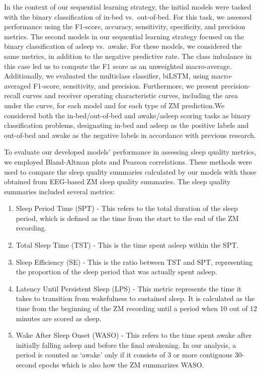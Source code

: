 \documentclass[
  super,
  preprint,
  3p]{elsarticle}
\begin{document}
In the context of our sequential learning strategy, the initial models
were tasked with the binary classification of in-bed vs.~out-of-bed. For
this task, we assessed performance using the F1-score, accuracy,
sensitivity, specificity, and precision metrics. The second models in
our sequential learning strategy focused on the binary classification of
asleep vs.~awake. For these models, we considered the same metrics, in
addition to the negative predictive rate. The class imbalance in this
case led us to compute the F1 score as an unweighted macro-average.
Additionally, we evaluated the multiclass classifier, biLSTM, using
macro-averaged F1-score, sensitivity, and precision. Furthermore, we
present precision-recall curves and receiver operating characteristic
curves, including the area under the curve, for each model and for each
type of ZM prediction.We considered both the in-bed/out-of-bed and
awake/asleep scoring tasks as binary classification problems,
designating in-bed and asleep as the positive labels and out-of-bed and
awake as the negative labels in accordance with previous
research\citep{hjorth2012, kushida2001}.

To evaluate our developed models' performance in assessing sleep quality
metrics, we employed Bland-Altman plots and Pearson correlations. These
methods were used to compare the sleep quality summaries calculated by
our models with those obtained from EEG-based ZM sleep quality
summaries. The sleep quality summaries included several metrics:

\begin{enumerate}
\def\labelenumi{\arabic{enumi}.}
\item
  Sleep Period Time (SPT) - This refers to the total duration of the
  sleep period, which is defined as the time from the start to the end
  of the ZM recording.
\item
  Total Sleep Time (TST) - This is the time spent asleep within the SPT.
\item
  Sleep Efficiency (SE) - This is the ratio between TST and SPT,
  representing the proportion of the sleep period that was actually
  spent asleep.
\item
  Latency Until Persistent Sleep (LPS) - This metric represents the time
  it takes to transition from wakefulness to sustained sleep. It is
  calculated as the time from the beginning of the ZM recording until a
  period when 10 out of 12 minutes are scored as sleep.
\item
  Wake After Sleep Onset (WASO) - This refers to the time spent awake
  after initially falling asleep and before the final awakening. In our
  analysis, a period is counted as `awake' only if it consists of 3 or
  more contiguous 30-second epochs which is also how the ZM summarizes
  WASO.
\end{enumerate}
\end{document}

